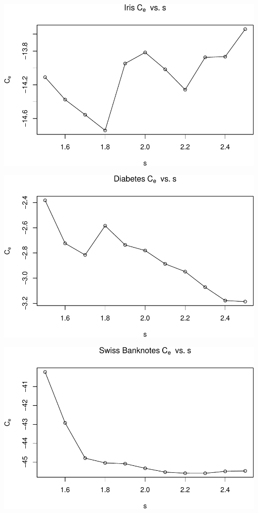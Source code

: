 \documentclass[]{article}
\begin{document}
\begin{center}\includegraphics[width=1\linewidth]{Report_files/figure-latex/unnamed-chunk-24-2} \end{center}

\begin{center}\includegraphics[width=1\linewidth]{Report_files/figure-latex/unnamed-chunk-24-3} \end{center}

\begin{center}\includegraphics[width=1\linewidth]{Report_files/figure-latex/unnamed-chunk-24-4} \end{center}
\end{document}
